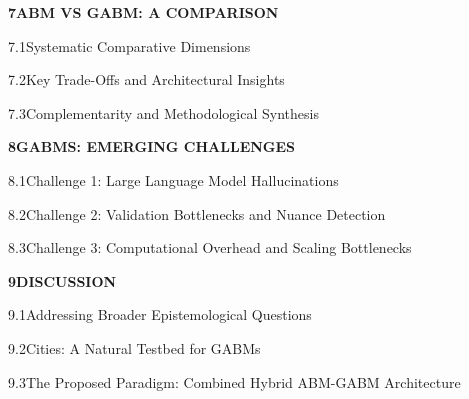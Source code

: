 \documentclass[12pt,a4paper]{report}
\begin{document}
\noindent\textbf{7\quad ABM VS GABM: A COMPARISON}\dotfill\textbf{\pageref{chap:abm_vs_gabm}}\par
\vspace{3pt}
\noindent\hspace{0.3in}7.1\quad Systematic Comparative Dimensions\dotfill\pageref{sec:comp_dimensions}\par
\vspace{2pt}
\noindent\hspace{0.3in}7.2\quad Key Trade-Offs and Architectural Insights\dotfill\pageref{sec:trade_offs}\par
\vspace{2pt}
\noindent\hspace{0.3in}7.3\quad Complementarity and Methodological Synthesis\dotfill\pageref{sec:complementarity}\par
\vspace{6pt}

\noindent\textbf{8\quad GABMS: EMERGING CHALLENGES}\dotfill\textbf{\pageref{chap:emerging_challenges}}\par
\vspace{3pt}
\noindent\hspace{0.3in}8.1\quad Challenge 1: Large Language Model Hallucinations\dotfill\pageref{sec:hallucinations}\par
\vspace{2pt}
\noindent\hspace{0.3in}8.2\quad Challenge 2: Validation Bottlenecks and Nuance Detection\dotfill\pageref{sec:val_bottlenecks}\par
\vspace{2pt}
\noindent\hspace{0.3in}8.3\quad Challenge 3: Computational Overhead and Scaling Bottlenecks\dotfill\pageref{sec:comp_bottlenecks}\par
\vspace{6pt}

\noindent\textbf{9\quad DISCUSSION}\dotfill\textbf{\pageref{chap:discussion}}\par
\vspace{3pt}
\noindent\hspace{0.3in}9.1\quad Addressing Broader Epistemological Questions\dotfill\pageref{sec:epist_questions}\par
\vspace{2pt}
\noindent\hspace{0.3in}9.2\quad Cities: A Natural Testbed for GABMs\dotfill\pageref{sec:cities_testbed}\par
\vspace{2pt}
\noindent\hspace{0.3in}9.3\quad The Proposed Paradigm: Combined Hybrid ABM-GABM Architecture\dotfill\pageref{sec:hybrid_architecture}\par
\vspace{6pt}
\end{document}
